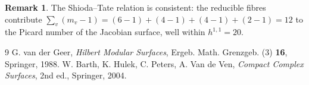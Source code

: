 \documentclass[11pt]{article}
\theoremstyle{definition}
\newtheorem{remark}[theorem]{Remark}
\begin{document}
\begin{remark}
The Shioda--Tate relation is consistent: the reducible fibres contribute
$\sum_v(m_v-1)=(6-1)+(4-1)+(4-1)+(2-1)=12$ to the Picard number of the Jacobian
surface, well within $h^{1,1}=20$.
\end{remark}

\begin{thebibliography}{9}
 G. van der Geer, \emph{Hilbert Modular Surfaces},
  Ergeb. Math. Grenzgeb. (3) \textbf{16}, Springer, 1988.
 W. Barth, K. Hulek, C. Peters, A. Van de Ven,
  \emph{Compact Complex Surfaces}, 2nd ed., Springer, 2004.
\end{thebibliography}
\end{document}
